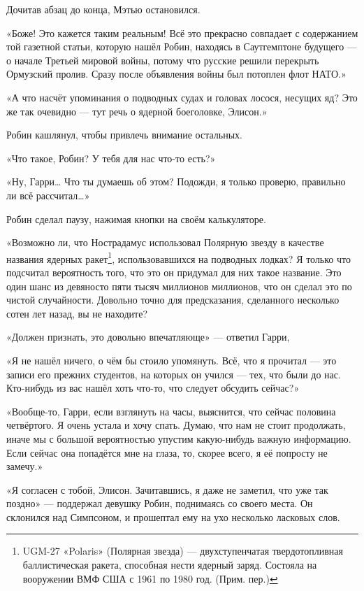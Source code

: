 \documentclass[a5paper, 9pt,
final, openany, twoside=true]{memoir}
\begin{document}
Дочитав абзац до конца, Мэтью остановился.

«Боже! Это кажется таким реальным! Всё это прекрасно совпадает с содержанием той газетной статьи, которую нашёл Робин, находясь в Саутгемптоне будущего — о начале Третьей мировой войны, потому что русские решили перекрыть Ормузский пролив. Сразу после объявления войны был потоплен флот НАТО.»

«А что насчёт упоминания о подводных судах и головах лосося, несущих яд? Это же так очевидно — тут речь о ядерной боеголовке, Элисон.»

Робин кашлянул, чтобы привлечь внимание остальных.

«Что такое, Робин? У тебя для нас что-то есть?»

«Ну, Гарри… Что ты думаешь об этом? Подожди, я только проверю, правильно ли всё рассчитал…»

Робин сделал паузу, нажимая кнопки на своём калькуляторе.

«Возможно ли, что Нострадамус использовал Полярную звезду в качестве названия ядерных ракет\footnote[1]{UGM-27 «Polaris» (Полярная звезда) — двухступенчатая твердотопливная баллистическая ракета, способная нести ядерный заряд. Состояла на вооружении ВМФ США с 1961 по 1980 год. (Прим. пер.)}, использовавшихся на подводных лодках? Я только что подсчитал вероятность того, что это он придумал для них такое название. Это один шанс из девяносто пяти тысяч миллионов миллионов, что он сделал это по чистой случайности. Довольно точно для предсказания, сделанного несколько сотен лет назад, вы не находите?

«Должен признать, это довольно впечатляюще» — ответил Гарри,

«Я не нашёл ничего, о чём бы стоило упомянуть. Всё, что я прочитал — это записи его прежних студентов, на которых он учился — тех, что были до нас. Кто-нибудь из вас нашёл хоть что-то, что следует обсудить сейчас?»

«Вообще-то, Гарри, если взглянуть на часы, выяснится, что сейчас половина четвёртого. Я очень устала и хочу спать. Думаю, что нам не стоит продолжать, иначе мы с большой вероятностью упустим какую-нибудь важную информацию. Если сейчас она попадётся мне на глаза, то, скорее всего, я её попросту не замечу.»

«Я согласен с тобой, Элисон. Зачитавшись, я даже не заметил, что уже так поздно» — поддержал девушку Робин, поднимаясь со своего места. Он склонился над Симпсоном, и прошептал ему на ухо несколько ласковых слов.
\end{document}
